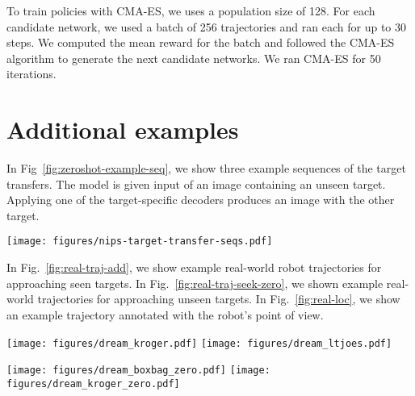 \documentclass[letterpaper, 10 pt, conference]{ieeeconf}
\newcommand{\mryoo}[1]{\fxnote{\hl{Michael: #1}}}
\begin{document}
To train policies with CMA-ES, we uses a population size of 128. For each candidate network, we used a batch of 256 trajectories and ran each for up to 30 steps. We computed the mean reward for the batch and followed the CMA-ES algorithm to generate the next candidate networks. We ran CMA-ES for 50 iterations.

\section{Additional examples}
In Fig~\ref{fig:zeroshot-example-seq}, we show three example sequences of the target transfers. The model is given input of an image containing an unseen target. Applying one of the target-specific decoders produces an image with the other target.

\begin{figure*}
    \centering
      \texttt{[image: figures/nips-target-transfer-seqs.pdf]}
      \caption{Example sequence of target transfer. \textbf{(a)} A sequence of an unseen bag transferred into a bottle. \textbf{(b)} An unseen volleyball transferred into a bottle. \textbf{(c)} An unseen volleyball turned into a bag.}
      \label{fig:zeroshot-example-seq}
\end{figure*}In Fig.~\ref{fig:real-traj-add}, we show example real-world robot trajectories for approaching seen targets. In Fig.~\ref{fig:real-traj-seek-zero}, we shown example real-world trajectories for approaching unseen targets. In Fig.~\ref{fig:real-loc}, we show an example trajectory annotated with the robot's point of view.

\begin{figure*}
    \centering
      \texttt{[image: figures/dream\_kroger.pdf]}
      \texttt{[image: figures/dream\_ltjoes.pdf]}
      \caption{Trajectories on the approaching task taken by the robot in the real world for various different seen targets. The target was on average 2.5 meters away from the robot.}
      \label{fig:real-traj-add}
\end{figure*}\begin{figure*}
    \centering
      \texttt{[image: figures/dream\_boxbag\_zero.pdf]}
      \texttt{[image: figures/dream\_kroger\_zero.pdf]}
      \caption{Trajectories on the approaching task taken by the robot in the real world for unseen targets.}
      \label{fig:real-traj-seek-zero}
\end{figure*}
\end{document}
